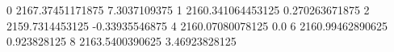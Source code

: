 0 2167.37451171875 7.3037109375
1 2160.341064453125 0.270263671875
2 2159.7314453125 -0.33935546875
4 2160.07080078125 0.0
6 2160.99462890625 0.923828125
8 2163.5400390625 3.46923828125

